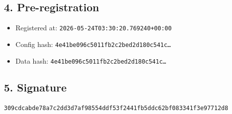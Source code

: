 \documentclass{article}
\begin{document}
\subsection*{4. Pre-registration}
\begin{itemize}
\item Registered at: \texttt{2026-05-24T03:30:20.769240+00:00}
\item Config hash: \texttt{4e41be096c5011fb2c2bed2d180c541c\dots}
\item Data hash: \texttt{4e41be096c5011fb2c2bed2d180c541c\dots}
\end{itemize}
\subsection*{5. Signature}
\texttt{309cdcabde78a7c2dd3d7af98554ddf53f2441fb5ddc62bf083341f3e97712d8}\\
\end{document}
